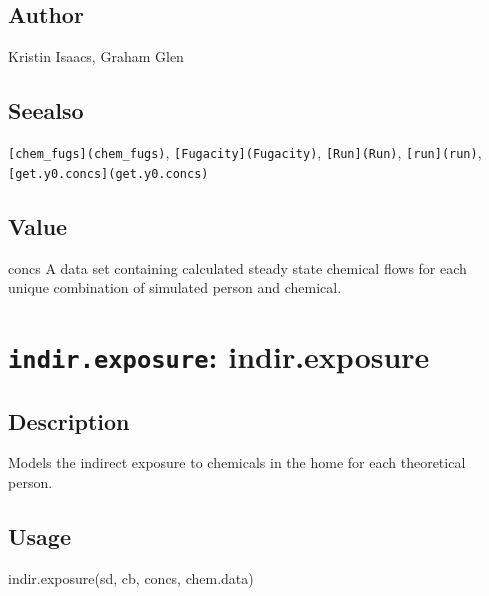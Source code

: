 \documentclass[
]{article}
\newenvironment{Shaded}{\begin{snugshade}}{\end{snugshade}}
\newcommand{\FunctionTok}[1]{\textcolor[rgb]{0.00,0.00,0.00}{#1}}
\newcommand{\NormalTok}[1]{#1}
\begin{document}
\hypertarget{author-20}{%
\subsection{Author}\label{author-20}}

Kristin Isaacs, Graham Glen

\hypertarget{seealso-16}{%
\subsection{Seealso}\label{seealso-16}}

\texttt{{[}chem\_fugs{]}(chem\_fugs)},
\texttt{{[}Fugacity{]}(Fugacity)}, \texttt{{[}Run{]}(Run)},
\texttt{{[}run{]}(run)}, \texttt{{[}get.y0.concs{]}(get.y0.concs)}

\hypertarget{value-21}{%
\subsection{Value}\label{value-21}}

concs A data set containing calculated steady state chemical flows for
each unique combination of simulated person and chemical.

\hypertarget{indir.exposure-indir.exposure}{%
\section{\texorpdfstring{\texttt{indir.exposure}:
indir.exposure}{indir.exposure: indir.exposure}}\label{indir.exposure-indir.exposure}}

\hypertarget{description-27}{%
\subsection{Description}\label{description-27}}

Models the indirect exposure to chemicals in the home for each
theoretical person.

\hypertarget{usage-27}{%
\subsection{Usage}\label{usage-27}}

\begin{Shaded}
\begin{Highlighting}[]
\FunctionTok{indir.exposure}\NormalTok{(sd, cb, concs, chem.data)}
\end{Highlighting}
\end{Shaded}
\end{document}
